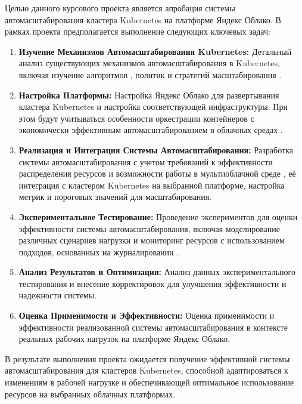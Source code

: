 Целью данного курсового проекта является апробация системы автомасштабирования
кластера Kubernetes на платформе Яндекс Облако. В рамках проекта
предполагается выполнение следующих ключевых задач:

\begin{enumerate}
 \item \textbf{Изучение Механизмов Автомасштабирования Kubernetes:} Детальный
анализ существующих механизмов автомасштабирования в Kubernetes, включая
изучение алгоритмов \cite{senjab2023survey}, политик и стратегий масштабирования
\cite{tran2022survey, qu2018auto, millnert2020holoscale}.
 
 \item \textbf{Настройка Платформы:} Настройка Яндекс Облако для развертывания
кластера Kubernetes и
настройка соответствующей инфраструктуры. При этом будут учитываться особенности
оркестрации контейнеров с экономически эффективным автомасштабированием в
облачных средах
\cite{rodriguez2020container}.
 
 \item \textbf{Реализация и Интеграция Системы Автомасштабирования:} Разработка
системы автомасштабирования с учетом требований к эффективности распределения
ресурсов
\cite{zhong2020cost} и возможности работы в мультиоблачной среде
\cite{jiang2020cloud},
её интеграция с кластером Kubernetes на выбранной
платформе, настройка метрик и пороговых значений для масштабирования.
 
 \item \textbf{Экспериментальное Тестирование:} Проведение экспериментов для
оценки эффективности системы автомасштабирования, включая моделирование
различных сценариев нагрузки и мониторинг ресурсов с использованием подходов, 
основанных на журналировании \cite{agrawal2018log}.
 
 \item \textbf{Анализ Результатов и Оптимизация:} Анализ данных
экспериментального тестирования и внесение корректировок для улучшения
эффективности и надежности системы.
 
 \item \textbf{Оценка Применимости и Эффективности:} Оценка применимости и
эффективности реализованной системы автомасштабирования в контексте реальных
рабочих нагрузок на платформе Яндекс Облако.
\end{enumerate}

В результате выполнения проекта ожидается получение эффективной системы
автомасштабирования для кластеров Kubernetes, способной адаптироваться к
изменениям в рабочей нагрузке и обеспечивающей оптимальное использование
ресурсов на выбранных облачных платформах.